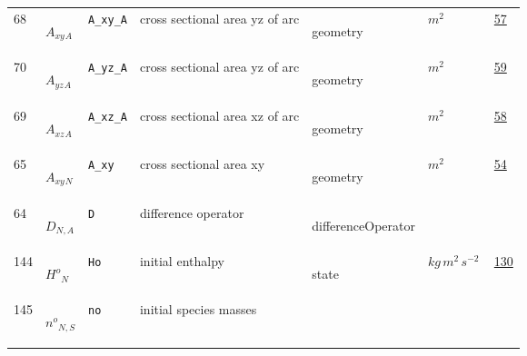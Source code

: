 \begin{longtable}{|p{1cm}|p{2.5cm}|p{4.5cm}|p{8cm}|p{3.0cm}|p{3cm}|p{1cm}|}
                 \\
            68
             & \hypertarget{"v:68"}{ $ {{A_{xy}}}{_{A}} $}
             & \verb|A_xy_A|
             & cross sectional area yz of arc
             & \begin{lay}geometry \end{lay}
             & $ m^{2} \, $
             &                 \hyperlink{"e:57"}{ 57 }
                 \\
            70
             & \hypertarget{"v:70"}{ $ {{A_{yz}}}{_{A}} $}
             & \verb|A_yz_A|
             & cross sectional area yz of arc
             & \begin{lay}geometry \end{lay}
             & $ m^{2} \, $
             &                 \hyperlink{"e:59"}{ 59 }
                 \\
            69
             & \hypertarget{"v:69"}{ $ {{A_{xz}}}{_{A}} $}
             & \verb|A_xz_A|
             & cross sectional area xz of arc
             & \begin{lay}geometry \end{lay}
             & $ m^{2} \, $
             &                 \hyperlink{"e:58"}{ 58 }
                 \\
            65
             & \hypertarget{"v:65"}{ $ {{A_{xy}}}{_{N}} $}
             & \verb|A_xy|
             & cross sectional area xy
             & \begin{lay}geometry \end{lay}
             & $ m^{2} \, $
             &                 \hyperlink{"e:54"}{ 54 }
                 \\
            64
             & \hypertarget{"v:64"}{ $ {D}{_{N, A}} $}
             & \verb|D|
             & difference operator
             & \begin{lay}differenceOperator \end{lay}
             & $  $
             & \\
            144
             & \hypertarget{"v:144"}{ $ {{H^o}}{_{N}} $}
             & \verb|Ho|
             & initial enthalpy
             & \begin{lay}state \end{lay}
             & $ kg \,m^{2} \,s^{-2} \, $
             &                 \hyperlink{"e:130"}{ 130 }
                 \\
            145
             & \hypertarget{"v:145"}{ $ {{n^o}}{_{N, S}} $}
             & \verb|no|
             & initial species masses

\end{longtable}
